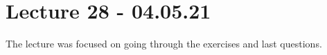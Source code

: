 



\section{Lecture 28 - 04.05.21}

The lecture was focused on going through the exercises and last questions. 